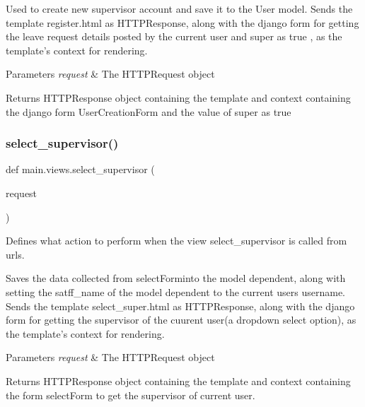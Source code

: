 Used to create new supervisor account and save it to the User model. Sends the template register.\+html as H\+T\+T\+P\+Response, along with the django form for getting the leave request details posted by the current user and \textquotesingle{}super\textquotesingle{} as true , as the template’s context for rendering. 
\begin{DoxyParams}{Parameters}
{\em request} & The H\+T\+T\+P\+Request object \\
\hline
\end{DoxyParams}
\begin{DoxyReturn}{Returns}
H\+T\+T\+P\+Response object containing the template and context containing the django form User\+Creation\+Form and the value of super as true 
\end{DoxyReturn}
\mbox{\label{namespacemain_1_1views_abdf62da100e2d6945871318f111c478c}} 
\subsubsection{\texorpdfstring{select\+\_\+supervisor()}{select\_supervisor()}}
{\footnotesize\ttfamily def main.\+views.\+select\+\_\+supervisor (\begin{DoxyParamCaption}\item[{}]{request }\end{DoxyParamCaption})}



Defines what action to perform when the view \textquotesingle{}select\+\_\+supervisor\textquotesingle{} is called from urls. 

Saves the data collected from select\+Forminto the model dependent, along with setting the satff\+\_\+name of the model dependent to the current user\textquotesingle{}s username. Sends the template select\+\_\+super.\+html as H\+T\+T\+P\+Response, along with the django form for getting the supervisor of the cuurent user(a dropdown select option), as the template’s context for rendering. 
\begin{DoxyParams}{Parameters}
{\em request} & The H\+T\+T\+P\+Request object \\
\hline
\end{DoxyParams}
\begin{DoxyReturn}{Returns}
H\+T\+T\+P\+Response object containing the template and context containing the form select\+Form to get the supervisor of current user. 
\end{DoxyReturn}
